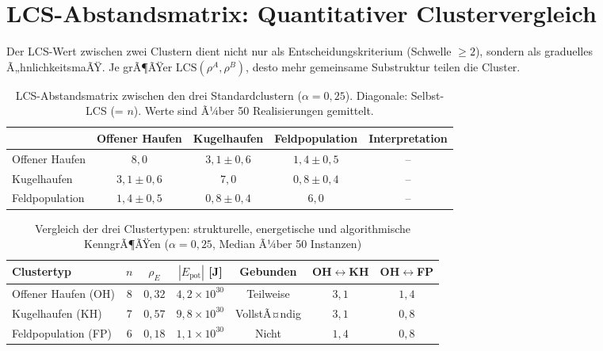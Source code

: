 ﻿\documentclass[a4paper,12pt]{report}
\theoremstyle{definition}
\begin{document}
\section{LCS-Abstandsmatrix: Quantitativer Clustervergleich}
\label{sec:empirie_lcs}

Der LCS-Wert zwischen zwei Clustern dient nicht nur als Entscheidungskriterium (Schwelle $\geq 2$), sondern als graduelles Ã„hnlichkeitsmaÃŸ. Je grÃ¶ÃŸer $\mathrm{LCS}(\rho^A, \rho^B)$, desto mehr gemeinsame Substruktur teilen die Cluster.

\begin{table}[H]
\centering
\caption{LCS-Abstandsmatrix zwischen den drei Standardclustern ($\alpha = 0{,}25$). Diagonale: Selbst-LCS (= $n$). Werte sind Ã¼ber 50 Realisierungen gemittelt.}
\label{tab:lcs_matrix}
\begin{tabular}{lcccc}
\toprule
 & Offener Haufen & Kugelhaufen & Feldpopulation & Interpretation \\
\midrule
Offener Haufen  & $8{,}0$ & $3{,}1 \pm 0{,}6$ & $1{,}4 \pm 0{,}5$ & -- \\
Kugelhaufen     & $3{,}1 \pm 0{,}6$ & $7{,}0$ & $0{,}8 \pm 0{,}4$ & -- \\
Feldpopulation  & $1{,}4 \pm 0{,}5$ & $0{,}8 \pm 0{,}4$ & $6{,}0$ & -- \\
\bottomrule
\end{tabular}
\end{table}

\begin{table}[H]
\centering
\caption{Vergleich der drei Clustertypen: strukturelle, energetische und algorithmische KenngrÃ¶ÃŸen ($\alpha = 0{,}25$, Median Ã¼ber 50 Instanzen)}
\label{tab:vergleich}
\begin{tabular}{lcccccc}
\toprule
Clustertyp & $n$ & $\rho_E$ & $|E_\mathrm{pot}|$ [J] & Gebunden & OH$\leftrightarrow$KH & OH$\leftrightarrow$FP \\
\midrule
Offener Haufen (OH) & 8  & $0{,}32$ & $4{,}2 \times 10^{30}$ & Teilweise   & $3{,}1$ & $1{,}4$ \\
Kugelhaufen (KH)    & 7  & $0{,}57$ & $9{,}8 \times 10^{30}$ & VollstÃ¤ndig & $3{,}1$ & $0{,}8$ \\
Feldpopulation (FP) & 6  & $0{,}18$ & $1{,}1 \times 10^{30}$ & Nicht       & $1{,}4$ & $0{,}8$ \\
\bottomrule
\end{tabular}
\end{table}
\end{document}
